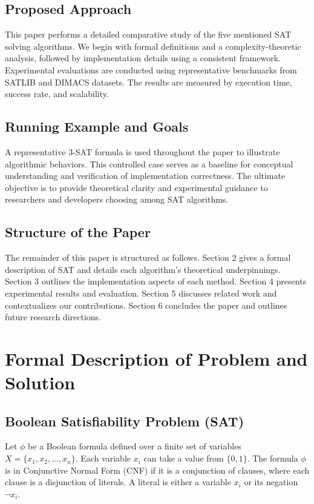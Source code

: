 \documentclass[11pt]{article}
\begin{document}
\subsection*{Proposed Approach}

This paper performs a detailed comparative study of the five mentioned SAT solving algorithms. We begin with formal definitions and a complexity-theoretic analysis, followed by implementation details using a consistent framework. Experimental evaluations are conducted using representative benchmarks from SATLIB and DIMACS datasets. The results are measured by execution time, success rate, and scalability.

\subsection*{Running Example and Goals}

A representative 3-SAT formula is used throughout the paper to illustrate algorithmic behaviors. This controlled case serves as a baseline for conceptual understanding and verification of implementation correctness. The ultimate objective is to provide theoretical clarity and experimental guidance to researchers and developers choosing among SAT algorithms.

\subsection*{Structure of the Paper}

The remainder of this paper is structured as follows. Section 2 gives a formal description of SAT and details each algorithm’s theoretical underpinnings. Section 3 outlines the implementation aspects of each method. Section 4 presents experimental results and evaluation. Section 5 discusses related work and contextualizes our contributions. Section 6 concludes the paper and outlines future research directions.


\section{Formal Description of Problem and Solution}

\subsection*{Boolean Satisfiability Problem (SAT)}

Let $\phi$ be a Boolean formula defined over a finite set of variables $X = \{x_1, x_2, ..., x_n\}$. Each variable $x_i$ can take a value from $\{0,1\}$. The formula $\phi$ is in Conjunctive Normal Form (CNF) if it is a conjunction of clauses, where each clause is a disjunction of literals. A literal is either a variable $x_i$ or its negation $\neg x_i$.
\end{document}
